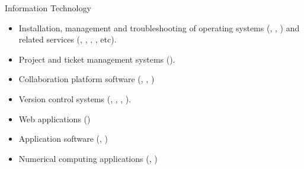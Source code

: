\vspace{-2.5em}



\begin{cvskills}

\cvskill
{Information Technology}
{
\begin{minipage}{0.48\textwidth}
\begin{itemize}[labelwidth=\the\widest,align=right,leftmargin=!,labelsep=1pt,noitemsep]
\item[\custItem] Installation, management and troubleshooting of
operating systems (\textsc{\color{awesome}{Linux/Unix}},
\textsc{\color{awesome}{Windows}}, \textsc{\color{awesome}{MacOS}}) and
related services (\textsc{\color{awesome}{ssh}}, \textsc{\color{awesome}{ftp}},
\textsc{\color{awesome}{nfs}}, \textsc{\color{awesome}{VPN}}, etc).
\item[\custItem] Project and ticket management systems (\textsc{\color{awesome}{JIRA}}).
\item[\custItem] Collaboration platform software (\textsc{\color{awesome}{twiki}},
\textsc{\color{awesome}{wiki}}, \textsc{\color{awesome}{Confluence}})
\item[\custItem] Version control systems (\textsc{\color{awesome}{Git}},
\textsc{\color{awesome}{GitLab}}, \textsc{\color{awesome}{svn}},
\textsc{\color{awesome}{cvs}}).
\item[\custItem] Web applications (\textsc{\color{awesome}{Angular}})
\end{itemize}
\end{minipage}
\hfill
\begin{minipage}{0.48\textwidth}
\begin{itemize}[labelwidth=\the\widest,align=right,leftmargin=!,labelsep=1pt,noitemsep]
\item[\custItem] Application software
(\textsc{\color{awesome}{Microsoft Office}},
\textsc{\color{awesome}{Google Doc Suite}})
\item[\custItem] Numerical computing applications
(\textsc{\color{awesome}{Matlab}}, \textsc{\color{awesome}{Mathematica}})

\end{itemize}
\end{minipage}}
\end{cvskills}
